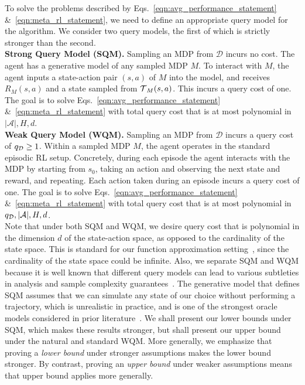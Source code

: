 \documentclass[11pt,twoside]{article}
\begin{document}
To solve the problems described by Eqs.~\eqref{eqn:avg_performance_statement} \&~\eqref{eqn:meta_rl_statement}, we need to define an appropriate query model for the algorithm. We consider two query models, the first of which is strictly stronger than the second. \\

\noindent \textbf{Strong Query Model (SQM).} Sampling an MDP from $\mathcal{D}$ incurs no cost. The agent has a generative model of any sampled MDP $M$. To interact with $M$, the agent inputs a state-action pair $(s,a)$ of $M$ into the model, and receives $R_M(s,a)$ and a state sampled from $\operatorname{\mathcal{T}}_M(s,a)$. This incurs a query cost of one. The goal is to solve Eqs.~\eqref{eqn:avg_performance_statement} \&~\eqref{eqn:meta_rl_statement} with total query cost that is at most polynomial in $\vert \mathcal{A} \vert, H, d$. \\

\noindent \textbf{Weak Query Model (WQM).} Sampling an MDP from $\mathcal{D}$ incurs a query cost of $q_{\mathcal{D}} \geq 1$. Within a sampled MDP $M$, the agent operates in the standard episodic RL setup. Concretely, during each episode the agent interacts with the MDP by starting from $s_0$, taking an action and observing the next state and reward, and repeating. Each action taken during an episode incurs a query cost of one. The goal is to solve Eqs.~\eqref{eqn:avg_performance_statement} \&~\eqref{eqn:meta_rl_statement} with total query cost that is at most polynomial in $q_{\mathcal{D}}, \vert \mathcal{A} \vert, H, d$. \\

\noindent Note that under both SQM and WQM, we desire query cost that is polynomial in the dimension $d$ of the state-action space, as opposed to the cardinality of the state space. This is standard for our function approximation setting~\citep{du19shiftoracle, vanroy19, du20, lattimore20featurerep, weisz2021queryefficient}, since the cardinality of the state space could be infinite. Also, we separate SQM and WQM because it is well known that different query models can lead to various subtleties in analysis and sample complexity guarantees~\citep{du19shiftoracle, vanroy19, du20, lattimore20featurerep, weisz2021queryefficient}. The generative model that defines SQM assumes that we can simulate any state of our choice without performing a trajectory, which is unrealistic in practice, and is one of the strongest oracle models considered in prior literature~\citep{kearns99generative, azar12, sidford18, du20, lattimore20featurerep, agarwal20genmodel}. We shall present our lower bounds under SQM, which makes these results stronger, but shall present our upper bound under the natural and standard WQM. More generally, we emphasize that proving a \emph{lower bound} under stronger assumptions makes the lower bound stronger. By contrast, proving an \emph{upper bound} under weaker assumptions means that upper bound applies more generally.
\end{document}
